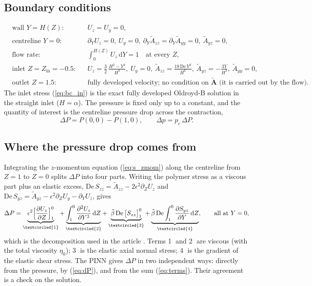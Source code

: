 \documentclass[11pt,a4paper]{article}
\newcommand{\De}{\mathrm{De}}
\newcommand{\bt}{\tilde\beta}
\newcommand{\term}[1]{\textcircled{\scriptsize #1}}
\begin{document}
\subsection{Boundary conditions}
\begin{align}
&\text{wall } Y=H(Z): && U_z=U_y=0, \label{eq:bc_wall}\\
&\text{centreline } Y=0: && \partial_YU_z=0,\ U_y=0,\ \partial_Y\tilde A_{zz}=\partial_Y\tilde A_{yy}=0,\ \tilde A_{yz}=0, \label{eq:bc_sym}\\
&\text{flow rate:} && \int_0^{H(Z)}U_z\,\mathrm dY=1\quad\text{at every }Z, \label{eq:bc_flux}\\
&\text{inlet } Z=Z_{\mathrm{in}}=-0.5: && U_z=\tfrac32\,\frac{H^2-Y^2}{H^3},\ U_y=0,\ \tilde A_{zz}=\frac{18\,\De\,Y^2}{H^6},\ \tilde A_{yz}=-\frac{3Y}{H^3},\ \tilde A_{yy}=0, \label{eq:bc_in}\\
&\text{outlet } Z=1.5: && \text{fully developed velocity; no condition on }\tilde{\mathbf A}\text{ (it is carried out by the flow)}. \label{eq:bc_out}
\end{align}
The inlet stress (\ref{eq:bc_in}) is the exact fully developed Oldroyd-B solution in the straight inlet ($H=\alpha$). The pressure is fixed only up to a constant, and the quantity of interest is the centreline pressure drop across the contraction,
\begin{equation}
\Delta P=P(0,0)-P(1,0),\qquad \Delta p=p_c\,\Delta P.
\label{eq:dP}
\end{equation}

\subsection{Where the pressure drop comes from}
Integrating the $z$-momentum equation (\ref{eq:s_zmom}) along the centreline from $Z=1$ to $Z=0$ splits $\Delta P$ into four parts. Writing the polymer stress as a viscous part plus an elastic excess, $\De\,S_{zz}=\tilde A_{zz}-2\epsilon^2\partial_ZU_z$ and $\De\,S_{yz}=\tilde A_{yz}-\epsilon^2\partial_ZU_y-\partial_YU_z$, gives
\begin{equation}
\Delta P=\underbrace{\epsilon^2\Big[\frac{\partial U_z}{\partial Z}\Big]_{1}^{0}}_{\term{1}}
+\underbrace{\int_1^0\frac{\partial^2U_z}{\partial Y^2}\,\mathrm dZ}_{\term{2}}
+\underbrace{\bt\,\De\,\big[S_{zz}\big]_{1}^{0}}_{\term{3}}
+\underbrace{\bt\,\De\int_1^0\frac{\partial S_{yz}}{\partial Y}\,\mathrm dZ}_{\term{4}},
\qquad\text{all at }Y=0,
\label{eq:terms}
\end{equation}
which is the decomposition used in the article \cite{boyko2022}. Terms \term{1} and \term{2} are viscous (with the total viscosity $\eta_0$); \term{3} is the elastic axial normal stress; \term{4} is the gradient of the elastic shear stress. The PINN gives $\Delta P$ in two independent ways: directly from the pressure, by (\ref{eq:dP}), and from the sum (\ref{eq:terms}). Their agreement is a check on the solution.
\end{document}
